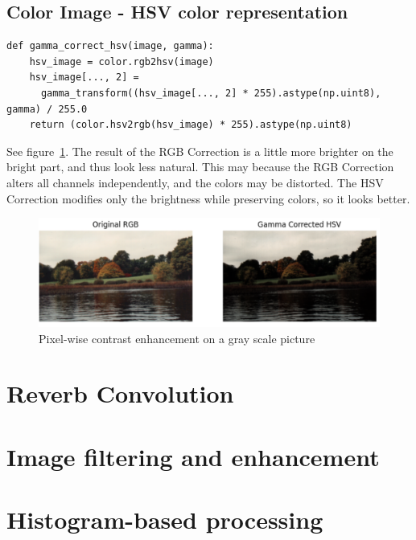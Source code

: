 \documentclass[12pt]{article}
\begin{document}
\subsection{Color Image - HSV color representation}

\begin{lstlisting}
def gamma_correct_hsv(image, gamma):
    hsv_image = color.rgb2hsv(image)
    hsv_image[..., 2] = 
      gamma_transform((hsv_image[..., 2] * 255).astype(np.uint8), gamma) / 255.0
    return (color.hsv2rgb(hsv_image) * 255).astype(np.uint8)
\end{lstlisting}

 See figure~\ref{fig:1.3}. 
 The result of the RGB Correction is a little more brighter on the bright part, and thus look less natural. This may because the RGB Correction alters all channels independently, and the colors may be distorted. The HSV Correction modifies only the brightness while preserving colors, so it looks better.

\begin{figure}[ht]
\centering
    \includegraphics[width=1\columnwidth, keepaspectratio]{pics/a2-1.3}
\caption[]{Pixel-wise contrast enhancement on a gray scale picture}
\label{fig:1.3}
\end{figure}

\section{Reverb Convolution}

\section{Image filtering and enhancement}

\section{Histogram-based processing}
\end{document}
